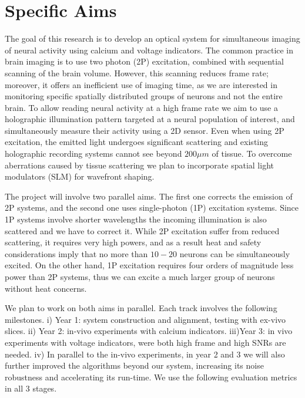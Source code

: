 \section*{Specific Aims}

The goal of this research is to develop an optical system for simultaneous imaging of neural activity using calcium and voltage indicators. 
The common practice in brain imaging is to use two photon (2P) excitation,  combined with sequential scanning of the brain volume. However, this scanning reduces frame rate; moreover, it offers an inefficient  use of imaging time, as we are  interested in monitoring specific spatially distributed groups of neurons and not the entire brain.
To allow reading neural activity at a high frame rate we aim to
use a holographic illumination pattern targeted at a neural population of interest, and simultaneously measure their activity using a 2D sensor. 
 Even when using 2P excitation, the emitted light  undergoes significant scattering and existing  holographic recording systems cannot see beyond $200\mu m$ of tissue.
 To overcome aberrations caused by tissue scattering we plan to incorporate spatial light modulators (SLM) for wavefront shaping. 

The project will involve two parallel aims. The first one corrects the emission of 2P systems, and the second one uses single-photon (1P) excitation systems. Since 1P systems involve shorter wavelengths the incoming illumination is also scattered  and we  have to correct it. 
While 2P excitation suffer  from reduced scattering, it requires very high powers, and as a result heat and safety considerations imply that no more than $10-20$ neurons can be simultaneously excited.  
On the other hand, 1P excitation requires four orders of magnitude less power than 2P systems, thus we can excite a much larger group of neurons without heat concerns.
	
We plan to work on both aims in parallel. Each track involves the following milestones. i) Year 1: system construction and alignment,  testing with ex-vivo   slices. ii) Year 2: in-vivo experiments with calcium indicators. iii)Year 3: in vivo experiments with voltage indicators, were both high frame and high SNRs are needed. iv) In parallel to the in-vivo experiments, in year 2 and 3 we will also further improved the algorithms beyond our system, increasing its noise robustness and accelerating its run-time.    We use the following evaluation metrics in all 3 stages. 


